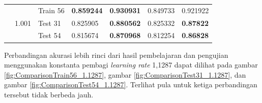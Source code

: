 \begin{table}[H]
\begin{small}
\begin{tabular}{|c|c|l|l|l|l|l|}
                                                                                       & \multirow{3}{*}{1.001}            & Train 56                                                                                                           & \textbf{0.859244}                     & \textbf{0.930931}                 & 0.849733                              & 0.921922                          \\ \cline{3-7} 
                                                                                       &                                   & Test 31                                                                                                            & 0.825905                              & \textbf{0.880562}                 & 0.825332                              & \textbf{0.87822}                  \\ \cline{3-7} 
                                                                                       &                                   & Test 54                                                                                                            & 0.815674                              & \textbf{0.870968}                 & 0.812254                              & \textbf{0.86828}                  \\ \hline
\end{tabular}
\end{small}
\end{table}

\noindent Perbandingan akurasi lebih rinci dari hasil pembelajaran dan pengujian menggunakan konstanta pembagi \textit{learning rate} 1,1287 dapat dilihat pada gambar \ref{fig:ComparisonTrain56_1.1287}, gambar \ref{fig:ComparisonTest31_1.1287}, dan gambar \ref{fig:ComparisonTest54_1.1287}. Terlihat pula untuk ketiga perbandingan tersebut tidak berbeda jauh.\\

\begin{adjustbox}{width=1\textwidth}
\noindent\begin{minipage}{\linewidth}
	\label{fig:ComparisonTrain56_1.1287}
\end{minipage}
\end{adjustbox}

